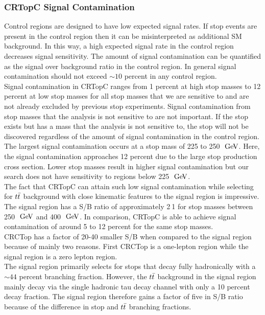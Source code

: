 \subsubsection{CRTopC Signal Contamination}

\indent Control regions are designed to have low expected signal rates.  If stop events are present in the control region then it can be misinterpreted as additional SM background.  In this way, a high expected signal rate in the control region decreases signal sensitivity.  The amount of signal contamination can be quantified as the signal over background ratio in the control region.  In general signal contamination should not exceed $\sim10$ percent in any control region.\\

\indent Signal contamination in CRTopC ranges from 1 percent at high stop masses to 12 percent at low stop masses for all stop masses that we are sensitive to and are not already excluded by previous stop experiments.  Signal contamination from stop masses that the analysis is not sensitive to are not important.  If the stop exists but has a mass that the analysis is not sensitive to, the stop will not be discovered regardless of the amount of signal contamination in the control region.\\

\indent The largest signal contamination occurs at a stop mass of 225 to 250 $\gev$.   Here, the signal contamination approaches 12 percent due to the large stop production cross section.  Lower stop masses result in higher signal contamination but our search does not have sensitivity to regions below 225 $\gev$.  \\

\indent The fact that CRTopC can attain such low signal contamination while selecting for $t\bar{t}$ background with close kinematic features to the signal region is impressive.  The signal region has a S/B ratio of approximately 2$\:$1 for stop masses between 250 $\gev$ and 400 $\gev$.   In comparison, CRTopC is able to achieve signal contamination of around 5 to 12 percent for the same stop masses.  \\

\indent CRCTop has a factor of 20-40 smaller S/B when compared to the signal region because of mainly two reasons.  First CRCTop is a one-lepton region while the signal region is a zero lepton region. \\

\indent The signal region primarily selects for stops that decay fully hadronically with a $\sim44$ percent branching fraction.  However, the $t\bar{t}$ background in the signal region mainly decay via the single hadronic tau decay channel with only a 10 percent decay fraction.  The signal region therefore gains a factor of five in S/B ratio because of the difference in stop and $t\bar{t}$ branching fractions.    \\

